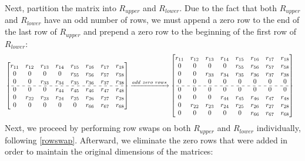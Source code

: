 \documentclass[12pt]{article}
\numberwithin{equation}{section}
\begin{document}
Next, partition the matrix into \( R_{upper} \) and \( R_{lower} \). Due to the fact that both \( R_{upper} \) and \( R_{lower} \) have an odd number of rows, we must append a zero row to the end of the last row of \( R_{upper} \) and prepend a zero row to the beginning of the first row of \( R_{lower} \): \begin{align*}
& \begin{bmatrix}
 r_{11} & r_{12} & r_{13} & r_{14} & r_{15} & r_{16} & r_{17} & r_{18}\\
 0      & 0      & 0      & 0      & r_{55} & r_{56} & r_{57} & r_{58}\\
 0      & 0      & r_{33} & r_{34} & r_{35} & r_{36} & r_{37} & r_{38}\\
 \cdashline{1-8}
 0      & 0      & 0      & r_{44} & r_{45} & r_{46} & r_{47} & r_{48}\\
 0      & r_{22}  & r_{23} & r_{24} & r_{25} & r_{26} & r_{27} & r_{28}\\
 0      & 0      & 0      & 0      & 0      & r_{66} & r_{67} & r_{68}\\
\end{bmatrix}
\xrightarrow{add\ zero\ rows}
\begin{bmatrix}
 r_{11} & r_{12} & r_{13} & r_{14} & r_{15} & r_{16} & r_{17} & r_{18}\\
 0      & 0      & 0      & 0      & r_{55} & r_{56} & r_{57} & r_{58}\\
 0      & 0      & r_{33} & r_{34} & r_{35} & r_{36} & r_{37} & r_{38}\\
 0      & 0      & 0      & 0      & 0      & 0      & 0      & 0     \\
 \cdashline{1-8}
 0      & 0      & 0      & 0      & 0      & 0      & 0      & 0     \\
 0      & 0      & 0      & r_{44} & r_{45} & r_{46} & r_{47} & r_{48}\\
 0      & r_{22} & r_{23} & r_{24} & r_{25} & r_{26} & r_{27} & r_{28}\\
 0      & 0      & 0      & 0      & 0      & r_{66} & r_{67} & r_{68}\\
\end{bmatrix} 
\end{align*}
Next, we proceed by performing row swaps on both \( R_{upper} \) and \( R_{lower} \) individually, following \eqref{rowswap}. Afterward, we eliminate the zero rows that were added in order to maintain the original dimensions of the matrices:\\
\end{document}
